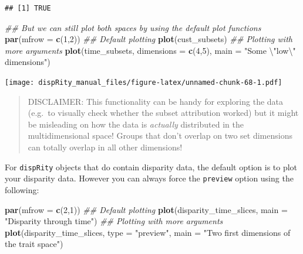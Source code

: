 \documentclass[]{book}
\newenvironment{Shaded}{\begin{snugshade}}{\end{snugshade}}
\newcommand{\CharTok}[1]{\textcolor[rgb]{0.31,0.60,0.02}{#1}}
\newcommand{\CommentTok}[1]{\textcolor[rgb]{0.56,0.35,0.01}{\textit{#1}}}
\newcommand{\DataTypeTok}[1]{\textcolor[rgb]{0.13,0.29,0.53}{#1}}
\newcommand{\DecValTok}[1]{\textcolor[rgb]{0.00,0.00,0.81}{#1}}
\newcommand{\KeywordTok}[1]{\textcolor[rgb]{0.13,0.29,0.53}{\textbf{#1}}}
\newcommand{\NormalTok}[1]{#1}
\newcommand{\StringTok}[1]{\textcolor[rgb]{0.31,0.60,0.02}{#1}}
\begin{document}
\begin{verbatim}
## [1] TRUE
\end{verbatim}

\begin{Shaded}
\begin{Highlighting}[]
\CommentTok{## But we can still plot both spaces by using the default plot functions}
\KeywordTok{par}\NormalTok{(}\DataTypeTok{mfrow =} \KeywordTok{c}\NormalTok{(}\DecValTok{1}\NormalTok{,}\DecValTok{2}\NormalTok{))}
\CommentTok{## Default plotting}
\KeywordTok{plot}\NormalTok{(cust_subsets)}
\CommentTok{## Plotting with more arguments}
\KeywordTok{plot}\NormalTok{(time_subsets, }\DataTypeTok{dimensions =} \KeywordTok{c}\NormalTok{(}\DecValTok{4}\NormalTok{,}\DecValTok{5}\NormalTok{),}
     \DataTypeTok{main =} \StringTok{"Some }\CharTok{\textbackslash{}"}\StringTok{low}\CharTok{\textbackslash{}"}\StringTok{ dimensions"}\NormalTok{)}
\end{Highlighting}
\end{Shaded}

\texttt{[image: dispRity\_manual\_files/figure-latex/unnamed-chunk-68-1.pdf]}

\begin{quote}
DISCLAIMER: This functionality can be handy for exploring the data (e.g.~to visually check whether the subset attribution worked) but it might be misleading on how the data is \emph{actually} distributed in the multidimensional space!
Groups that don't overlap on two set dimensions can totally overlap in all other dimensions!
\end{quote}

For \texttt{dispRity} objects that do contain disparity data, the default option is to plot your disparity data.
However you can always force the \texttt{preview} option using the following:

\begin{Shaded}
\begin{Highlighting}[]
\KeywordTok{par}\NormalTok{(}\DataTypeTok{mfrow =} \KeywordTok{c}\NormalTok{(}\DecValTok{2}\NormalTok{,}\DecValTok{1}\NormalTok{))}
\CommentTok{## Default plotting}
\KeywordTok{plot}\NormalTok{(disparity_time_slices, }\DataTypeTok{main =} \StringTok{"Disparity through time"}\NormalTok{)}
\CommentTok{## Plotting with more arguments}
\KeywordTok{plot}\NormalTok{(disparity_time_slices, }\DataTypeTok{type =} \StringTok{"preview"}\NormalTok{,}
     \DataTypeTok{main =} \StringTok{"Two first dimensions of the trait space"}\NormalTok{)}
\end{Highlighting}
\end{Shaded}
\end{document}
